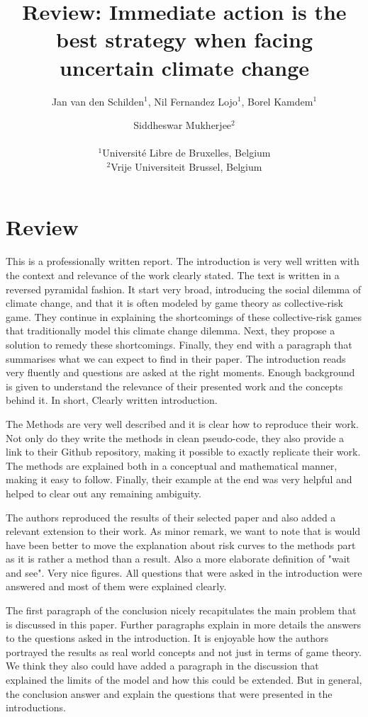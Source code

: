 \documentclass[letterpaper]{article}
\title{Review: Immediate action is the best strategy when facing uncertain climate change}
\author{Jan van den Schilden$^{1}$, Nil Fernandez Lojo$^{1}$, Borel Kamdem$^{1}$ \and Siddheswar Mukherjee$^2$ \\
\mbox{}\\
$^1$Université Libre de Bruxelles, Belgium\\
$^2$Vrije Universiteit Brussel, Belgium }
\begin{document}
\maketitle

 \section{Review}
This is a professionally written report.
The introduction is very well written with the context and relevance of the work clearly stated.
The text is written in a reversed pyramidal fashion.
It start very broad, introducing the social dilemma of climate change,
and that it is often modeled by game theory as collective-risk game.
They continue in explaining the shortcomings of these collective-risk games 
that traditionally model this climate change dilemma.
Next, they propose a solution to remedy these shortcomings.
Finally, they end with a paragraph that summarises what we can expect to find in their paper.
The introduction reads very fluently 
and questions are asked at the right moments.
Enough background is given to understand the relevance of their presented work and the concepts behind it. 
In short, Clearly written introduction.

The Methods are very well described and it is clear how to reproduce their work.
Not only do they write the methods in clean pseudo-code,
they also provide a link to their Github repository,
making it possible to exactly replicate their work.
The methods are explained both in a conceptual and mathematical manner, 
making it easy to follow.
Finally, their example at the end was very helpful 
and helped to clear out any remaining ambiguity.

The authors reproduced the results of their selected paper and also added a relevant extension to their work.
As minor remark, we want to note that is would have been better 
to move the explanation about risk curves to the methods part as it is rather a method than a result.
Also a more elaborate definition of "wait and see".
Very nice figures. 
All questions that were asked in the introduction were answered and most of them were explained clearly.

The first paragraph of the conclusion nicely recapitulates the main problem that is discussed in this paper.
Further paragraphs explain in more details the answers to the questions asked in the introduction.
It is enjoyable how the authors portrayed the results as real world concepts and not just in terms of game theory.
We think they also could have added a paragraph in the discussion that explained the limits of the model and how this could be extended.
But in general,
the conclusion answer and explain the questions that were presented in the introductions.
\end{document}
